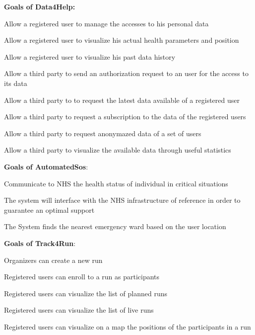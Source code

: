 \textbf{Goals of Data4Help:}
\begin{goalList}
\begin{enumerate}[label={[}G 1.\arabic*{]}]
    \item \label{goal:user1} Allow a registered user to manage the accesses to his personal data
    \item \label{goal:user2}Allow a registered user to visualize his actual health parameters and position
    \item \label{goal:user3}Allow a registered user to visualize his past data history
    
     \item \label{goal:parties1}Allow a third party to send an authorization request to an user for the access to its data
     \item \label{goal:parties2}Allow a third party to to request the latest data available of a registered user
 
    \item \label{goal:parties3}Allow a third party to request a subscription to the data of the registered users
    
    \item \label{goal:parties4}Allow a third party to request anonymazed data of a set of users 
    
    \item \label{goal:parties5}Allow a third party to visualize the available data through useful statistics 


\end{enumerate}
\textbf{Goals of AutomatedSos}:
\begin{enumerate}[label={[}G 2.\arabic*{]}]

\item \label{goal:sos1}Communicate to NHS the health status of individual in critical situations
\item \label{goal:sos2}
The system will interface with the NHS infrastructure of reference in order to guarantee an optimal support
\item \label{goal:sos3}The System finds the nearest emergency ward based on the user location

\end{enumerate}
\newpage

\textbf{Goals of Track4Run}:

\begin{enumerate}[label={[}G 3.\arabic*{]}]

\item \label{goal:run1}
Organizers can create a new run
\item \label{goal:run2}Registered users can enroll to a run as participants
\item \label{goal:run3}Registered users can visualize the list of planned runs

\item\label{goal:run5}Registered users can visualize the list of live runs


\item \label{goal:run4}Registered users can visualize on a map the positions of the participants
in a run


\end{enumerate}
\end{goalList}

